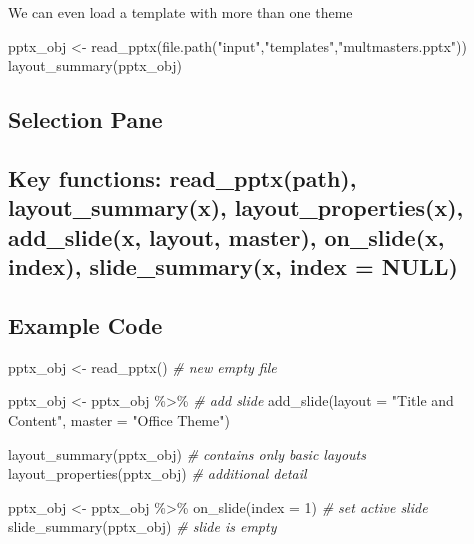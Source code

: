 \documentclass[
]{book}
\newenvironment{Shaded}{\begin{snugshade}}{\end{snugshade}}
\newcommand{\AttributeTok}[1]{\textcolor[rgb]{0.77,0.63,0.00}{#1}}
\newcommand{\CommentTok}[1]{\textcolor[rgb]{0.56,0.35,0.01}{\textit{#1}}}
\newcommand{\DecValTok}[1]{\textcolor[rgb]{0.00,0.00,0.81}{#1}}
\newcommand{\FunctionTok}[1]{\textcolor[rgb]{0.00,0.00,0.00}{#1}}
\newcommand{\NormalTok}[1]{#1}
\newcommand{\OtherTok}[1]{\textcolor[rgb]{0.56,0.35,0.01}{#1}}
\newcommand{\SpecialCharTok}[1]{\textcolor[rgb]{0.00,0.00,0.00}{#1}}
\newcommand{\StringTok}[1]{\textcolor[rgb]{0.31,0.60,0.02}{#1}}
\begin{document}
We can even load a template with more than one theme

\begin{Shaded}
\begin{Highlighting}[]
\NormalTok{pptx\_obj }\OtherTok{\textless{}{-}} \FunctionTok{read\_pptx}\NormalTok{(}\FunctionTok{file.path}\NormalTok{(}\StringTok{"input"}\NormalTok{,}\StringTok{"templates"}\NormalTok{,}\StringTok{"multmasters.pptx"}\NormalTok{))}
\FunctionTok{layout\_summary}\NormalTok{(pptx\_obj)}
\end{Highlighting}
\end{Shaded}

\hypertarget{selection-pane}{%
\subsection{Selection Pane}\label{selection-pane}}

\hypertarget{key-functions-read_pptxpath-layout_summaryx-layout_propertiesx-add_slidex-layout-master-on_slidex-index-slide_summaryx-index-null}{%
\subsection{Key functions: read\_pptx(path), layout\_summary(x), layout\_properties(x), add\_slide(x, layout, master), on\_slide(x, index), slide\_summary(x, index = NULL)}\label{key-functions-read_pptxpath-layout_summaryx-layout_propertiesx-add_slidex-layout-master-on_slidex-index-slide_summaryx-index-null}}

\hypertarget{example-code}{%
\subsection{Example Code}\label{example-code}}

\begin{Shaded}
\begin{Highlighting}[]
\NormalTok{pptx\_obj }\OtherTok{\textless{}{-}} \FunctionTok{read\_pptx}\NormalTok{() }\CommentTok{\# new empty file}

\NormalTok{pptx\_obj }\OtherTok{\textless{}{-}}\NormalTok{ pptx\_obj }\SpecialCharTok{\%\textgreater{}\%} \CommentTok{\# add slide}
  \FunctionTok{add\_slide}\NormalTok{(}\AttributeTok{layout =} \StringTok{"Title and Content"}\NormalTok{, }\AttributeTok{master =} \StringTok{"Office Theme"}\NormalTok{)}

\FunctionTok{layout\_summary}\NormalTok{(pptx\_obj) }\CommentTok{\# contains only basic layouts}
\FunctionTok{layout\_properties}\NormalTok{(pptx\_obj) }\CommentTok{\# additional detail}

\NormalTok{pptx\_obj }\OtherTok{\textless{}{-}}\NormalTok{ pptx\_obj }\SpecialCharTok{\%\textgreater{}\%} 
  \FunctionTok{on\_slide}\NormalTok{(}\AttributeTok{index =} \DecValTok{1}\NormalTok{) }\CommentTok{\# set active slide}
\FunctionTok{slide\_summary}\NormalTok{(pptx\_obj) }\CommentTok{\# slide is empty}
\end{Highlighting}
\end{Shaded}
\end{document}
